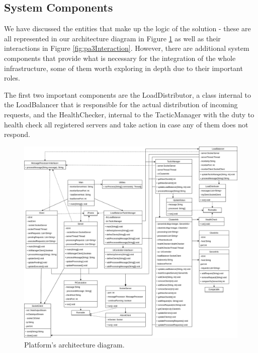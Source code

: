 \documentclass[12pt]{article}
\begin{document}
\subsection{System Components} %

We have discussed the entities that make up the logic of the solution - these are all represented in our architecture diagram in Figure \ref{fig:pa3Arch} as well
as their interactions in Figure \ref{fig:pa3Interaction}.
However, there are additional system components that provide what is necessary for the integration of the whole infrastructure, some of them worth exploring in 
depth due to their important roles.

The first two important components are the LoadDistributor, a class internal to the LoadBalancer that is responsible for the actual distribution of incoming requests, 
and the HealthChecker, internal to the TacticManager with the duty to health check all registered servers and take action in case any of them does not respond.

\begin{figure}[H]
  \centering
  \begin{minipage}{\textwidth}
    \centering
    \includegraphics[width=\linewidth]{img/pa3Arch.png}
  \end{minipage}%
  \caption{Platform's architecture diagram.}
  \label{fig:pa3Arch}
\end{figure} 
\end{document}
